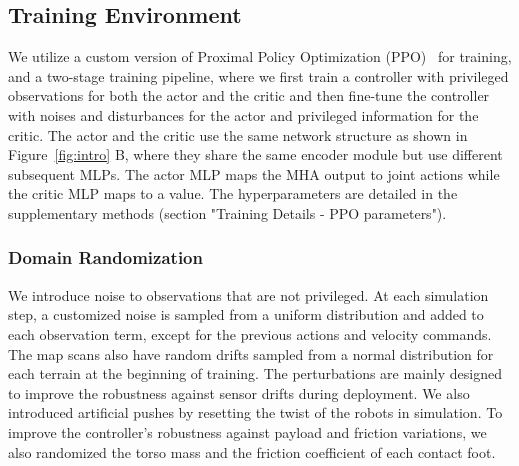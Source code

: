 \documentclass[9pt,twocolumn,twoside]{osajnl}
\begin{document}

\subsection*{Training Environment}
We utilize a custom version of Proximal Policy Optimization (PPO)~\cite{ppo} for training, and a two-stage training pipeline, where we first train a controller with privileged observations for both the actor and the critic and then fine-tune the controller with noises and disturbances for the actor and privileged information for the critic. The actor and the critic use the same network structure as shown in Figure~\ref{fig:intro} B, where they share the same encoder module but use different subsequent MLPs. The actor MLP maps the MHA output to joint actions while the critic MLP maps to a value. The hyperparameters are detailed in the supplementary methods (section "Training Details - PPO parameters"). 

\subsubsection*{Domain Randomization}
We introduce noise to observations that are not privileged. At each simulation step, a customized noise is sampled from a uniform distribution and added to each observation term, except for the previous actions and velocity commands. The map scans also have random drifts sampled from a normal distribution for each terrain at the beginning of training. The perturbations are mainly designed to improve the robustness against sensor drifts during deployment. We also introduced artificial pushes by resetting the twist of the robots in simulation. To improve the controller's robustness against payload and friction variations, we also randomized the torso mass and the friction coefficient of each contact foot. 
\end{document}
